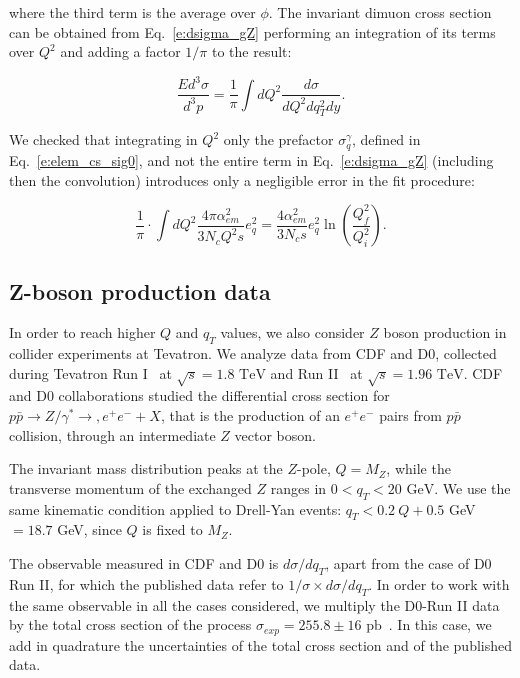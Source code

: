 \documentclass[aps,preprintnumbers,showpacs,nofootinbib,superscriptaddress,floatfix]{revtex4}
\begin{document}
where the third term is the average over $\phi$.
The invariant dimuon cross section can be obtained from Eq.~\ref{e:dsigma_gZ} performing an integration of its terms over $Q^2$ and adding a factor $1/\pi$ to the result:

\begin{equation}
\frac{Ed^3\sigma}{d^3p} = \frac{1}{\pi} \int dQ^2 \frac{d\sigma}{dQ^2dq^2_T dy} .
\end{equation}

We checked that integrating in $Q^2$ only the prefactor $\sigma_q^\gamma$, defined in Eq.~\ref{e:elem_cs_sig0}, and not the entire term in Eq.~\ref{e:dsigma_gZ} (including then the convolution) introduces only a negligible error in the fit procedure:  

\begin{equation}
\frac{1}{\pi} \cdot \int dQ^2 \frac{4\pi \alpha^2_{em}}{3N_cQ^2 s} e_q^2 
= \frac{4\alpha_{em}^2}{3 N_c s} e_q^2 \ln \left( \frac{Q_f^2}{Q_i^2} \right) .
\end{equation}

\subsection{Z-boson production data}
\label{ss:zboson}

In order to reach higher $Q$ and $q_T$ values, we also consider $Z$ boson production in collider experiments at Tevatron. 
We analyze data from CDF and D0, collected during Tevatron Run I~\cite{Affolder:1999jh,Abbott:1999wk} at $\sqrt{s}=1.8\text{ TeV}$ and Run II~\cite{Aaltonen:2012fi,Abazov:2007ac} at $\sqrt{s}=1.96\text{ TeV}$. CDF and D0 collaborations studied the differential cross section for $p\bar{p}\rightarrow Z/\gamma^* \rightarrow, e^+e^- + X$, that is the production of an $e^+e^-$ pairs from $p\bar{p}$ collision,  through an intermediate $Z$ vector boson. 

The invariant mass distribution peaks at the $Z$-pole, $Q=M_Z$, while the transverse momentum of the exchanged $Z$ ranges in $0< q_T < 20 \text{ GeV}$.
We use the same kinematic condition applied to Drell-Yan events:  $q_T < 0.2\ Q + 0.5$ GeV $ = 18.7$ GeV, since $Q$ is fixed to $M_Z$. 

The observable measured in CDF and D0 is $d\sigma /dq_T$,  apart from the case of D0 Run II, for which the published data refer to $1/\sigma \times d\sigma/dq_T$. In order to work with the same observable in all the cases considered, we multiply the D0-Run II data by the total cross section of the process $\sigma_{exp} = 255.8 \pm 16 \text{ pb}$~\cite{Abulencia:2005ix}. In this case, we add in quadrature the uncertainties of the total cross section and of the published data. 
\end{document}
